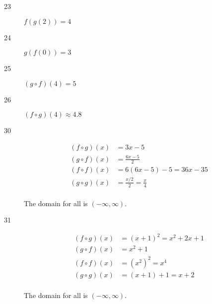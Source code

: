 \documentclass{exam}
\begin{document}
\begin{description}

    \item[23] $f(g(2)) = 4$

    \item[24] $g(f(0)) = 3$

    \item[25] $(g \circ f)(4) = 5$

    \item[26] $(f \circ g)(4) \approx 4.8$

    \item[30]
      \begin{align*}
        (f \circ g)(x) &= 3x - 5 \\
        (g \circ f)(x) &= \frac{6x - 5}{2} \\
        (f \circ f)(x) &= 6(6x - 5) - 5 = 36x - 35 \\
        (g \circ g)(x) &= \frac{x/2}{2} = \frac{x}{4} \\
      \end{align*}

      The domain for all is $(-\infty, \infty)$.

    \item[31]
      \begin{align*}
        (f \circ g)(x) &= (x + 1)^2 = x^2 + 2x + 1 \\
        (g \circ f)(x) &= x^2 + 1 \\ (f \circ f)(x) &= (x^2)^2 = x^4 \\
        (g \circ g)(x) &= (x + 1) + 1 = x + 2 \\
      \end{align*}

      The domain for all is $(-\infty, \infty)$.

% 


\end{description}
\end{document}
